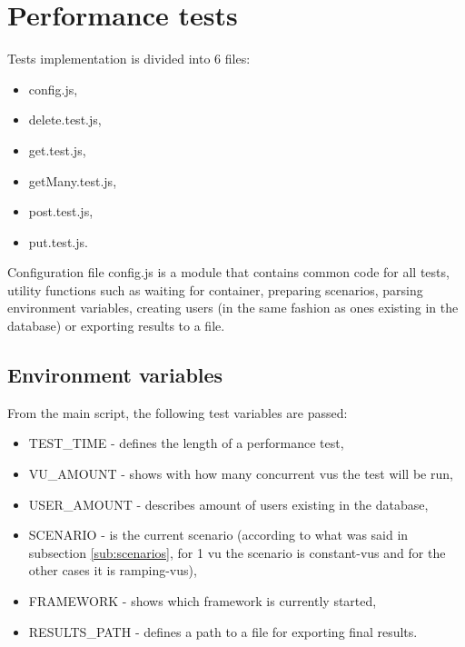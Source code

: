 \section{Performance tests}
Tests implementation is divided into 6 files:
\begin{itemize}
    \item config.js,
    \item delete.test.js,
    \item get.test.js,
    \item getMany.test.js,
    \item post.test.js,
    \item put.test.js.
\end{itemize}
Configuration file config.js is a module that contains common code for all tests, utility functions such as waiting for container, preparing scenarios, parsing environment variables, creating users (in the same fashion as ones existing in the database) or exporting results to a file.

\subsection{Environment variables}
From the main script, the following test variables are passed:
\begin{itemize}
    \item TEST\_TIME - defines the length of a performance test,
    \item VU\_AMOUNT - shows with how many concurrent \acrshort{vu}s the test will be run,
    \item USER\_AMOUNT - describes amount of users existing in the database,
    \item SCENARIO - is the current scenario (according to what was said in subsection \ref{sub:scenarios}, for 1 \acrshort{vu} the scenario is constant-vus and for the other cases it is ramping-vus),
    \item FRAMEWORK - shows which framework is currently started,
    \item RESULTS\_PATH - defines a path to a file for exporting final results.
\end{itemize}

